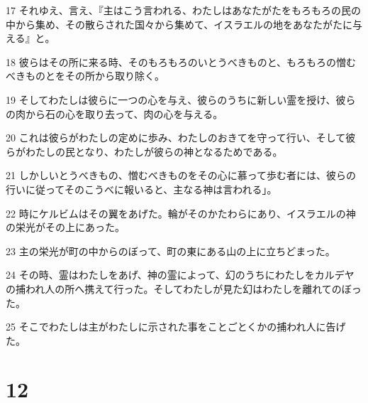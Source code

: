 \par 17 それゆえ、言え、『主はこう言われる、わたしはあなたがたをもろもろの民の中から集め、その散らされた国々から集めて、イスラエルの地をあなたがたに与える』と。
\par 18 彼らはその所に来る時、そのもろもろのいとうべきものと、もろもろの憎むべきものとをその所から取り除く。
\par 19 そしてわたしは彼らに一つの心を与え、彼らのうちに新しい霊を授け、彼らの肉から石の心を取り去って、肉の心を与える。
\par 20 これは彼らがわたしの定めに歩み、わたしのおきてを守って行い、そして彼らがわたしの民となり、わたしが彼らの神となるためである。
\par 21 しかしいとうべきもの、憎むべきものをその心に慕って歩む者には、彼らの行いに従ってそのこうべに報いると、主なる神は言われる」。
\par 22 時にケルビムはその翼をあげた。輪がそのかたわらにあり、イスラエルの神の栄光がその上にあった。
\par 23 主の栄光が町の中からのぼって、町の東にある山の上に立ちどまった。
\par 24 その時、霊はわたしをあげ、神の霊によって、幻のうちにわたしをカルデヤの捕われ人の所へ携えて行った。そしてわたしが見た幻はわたしを離れてのぼった。
\par 25 そこでわたしは主がわたしに示された事をことごとくかの捕われ人に告げた。

\chapter{12}

